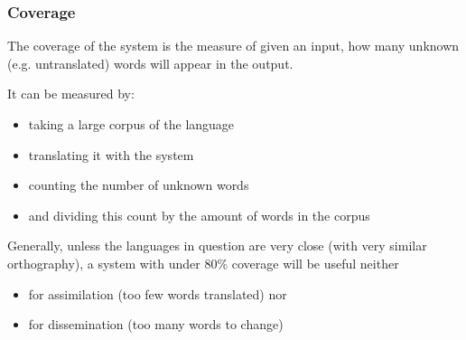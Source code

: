 \documentclass[10pt,xetex]{beamer} %
\begin{document}
\begin{frame}
  \frametitle{Coverage}

The coverage of the system is the measure of given an input, how many 
unknown (e.g. untranslated) words will appear in the output.

It can be measured by:

\begin{itemize}
  \item taking a large corpus of the language
  \item translating it with the system
  \item counting the number of unknown words
  \item and dividing this count by the amount of words in the corpus
\end{itemize}

Generally, unless the languages in question are very close (with very similar
orthography), a system with under 80\% coverage will be useful neither

\begin{itemize} 
  \item for assimilation (too few words translated) nor 
  \item for dissemination (too many words to change)
\end{itemize}

\end{frame}
%
%
%
%
%
%
%
%
\end{document}
